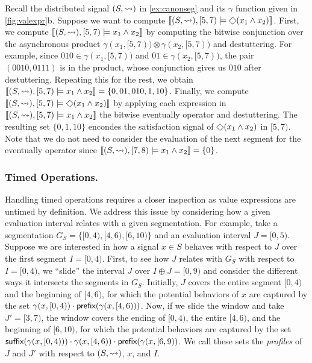 \begin{example}
	Recall the distributed signal $(S, {\rightsquigarrow})$ in \cref{ex:canonseg} and its $\gamma$ function given in \cref{fig:valexpr}b.
	Suppose we want to compute $\llbracket (S, {\hb}), [5,7) \models \LTLeventually(x_1 \land x_2) \rrbracket$.
	First, we compute $\llbracket (S, {\rightsquigarrow}), [5,7) \models x_1 \land x_2 \rrbracket$ by computing the bitwise conjunction over the asynchronous product $\gamma(x_1, [5,7)) \otimes \gamma(x_2, [5,7))$ and destuttering.
	For example, since $010 \in \gamma(x_1, [5,7))$ and $01 \in \gamma(x_2, [5,7))$, the pair $(0010,0111)$ is in the product, whose conjunction gives us $010$ after destuttering. 
	Repeating this for the rest, we obtain $\llbracket (S, {\rightsquigarrow}), [5,7) \models x_1 \land x_2 \rrbracket = \{ 0, 01, 010, 1, 10 \}$.
	Finally, we compute $\llbracket (S, {\hb}), [5,7) \models \LTLeventually(x_1 \land x_2) \rrbracket$ by applying each expression in $\llbracket (S, {\rightsquigarrow}), [5,7) \models x_1 \land x_2 \rrbracket$ the bitwise eventually operator and destuttering.
	The resulting set $\{0, 1, 10\}$ encondes the satisfaction signal of $\LTLeventually(x_1 \land x_2)$ in $[5,7)$.
	Note that we do not need to consider the evaluation of the next segment for the eventually operator since $\llbracket (S, {\rightsquigarrow}), [7,8) \models x_1 \land x_2 \rrbracket = \{0\}$.
\end{example}

\subsubsection{Timed Operations.}
Handling timed operations requires a closer inspection as value expressions are untimed by definition.
We address this issue by considering how a given evaluation interval relates with a given segmentation.
For example, take a segmentation $G_S = \{ [0,4), [4,6), [6,10) \}$ and an evaluation interval $J = [0,5)$.
Suppose we are interested in how a signal $x \in S$ behaves with respect to $J$ over the first segment $I = [0,4)$.
First, to see how $J$ relates with $G_S$ with respect to $I =[0,4)$, we  ``slide'' the interval $J$ over $I \oplus J = [0,9)$ and consider the different ways it intersects the segments in $G_S$.
Initially, $J$ covers the entire segment $[0,4)$ and the beginning of $[4,6)$, for which the potential behaviors of $x$ are captured by the set $\gamma(x, [0,4)) \cdot \textsf{prefix}(\gamma(x, [4,6)))$.
Now, if we slide the window and take $J' = [3,7)$, the window covers the ending of $[0,4)$, the entire $[4,6)$, and the beginning of $[6,10)$, for which the potential behaviors are captured by the set $\textsf{suffix}(\gamma(x, [0,4))) \cdot \gamma(x, [4,6)) \cdot \textsf{prefix}(\gamma(x, [6,9))$.
We call these sets the \emph{profiles} of $J$ and $J'$ with respect to $(S,{\rightsquigarrow})$, $x$, and $I$.

